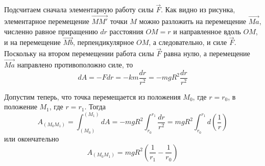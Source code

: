 Подсчитаем сначала элементарную работу силы \( \vec{F} \). Как видно из 
рисунка, элементарное перемещение \( \vec{MM'} \) точки \( M \) можно 
разложить на перемещение \( \vec{Ma} \), численно равное приращению 
\( dr \) расстояния \( OM = r \) и направленное вдоль \( OM \), и на 
перемещение \( \vec{Mb} \), перпендикулярное \( OM \), а следовательно, и 
силе \( \vec{F} \). Поскольку на втором перемещении работа силы 
\( \vec{F} \) равна нулю, а перемещение \( \vec{Ma} \) направлено 
противоположно силе, то 
\[ dA = -Fdr = -km\frac{dr}{r^2} = -mgR^2 \frac{dr}{r^2} \]

Допустим теперь, что точка перемещается из положения \( M_0 \), где 
\( r = r_0 \), в положение \( M_1 \), где \( r = r_1 \). Тогда 
\[ 
    A_{(M_0 M_1)} = \int_{(M_0)}^{(M_1)} dA = 
    -mgR^2 \int_{r_0}^{r_1} \frac{dr}{r^2} =
    mgR^2 \int_{r_0}^{r_1} d\left( \frac{1}{r} \right)
\]
или окончательно
\[ A_{(M_0 M_1)} = mgR^2 \left( \frac{1}{r_1} - \frac{1}{r_0} \right) \]

\newpage
